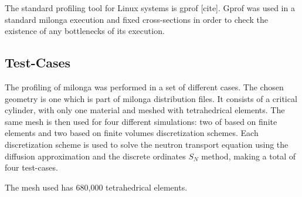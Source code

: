 \documentclass{anstrans}
\begin{document}
The standard profiling tool for Linux systems is gprof [cite]. Gprof was used in a standard milonga
execution
and fixed cross-sections in order to check
the existence of any bottlenecks of its execution.

\subsection{Test-Cases}

The profiling of milonga was performed in a set of different cases. The chosen geometry is one which is part of
milonga distribution files. It consists of a critical cylinder, with only one material and meshed with
tetrahedrical elements. The same mesh is then used for four different simulations: two of based on
finite elements and two based on finite volumes discretization schemes. Each discretization scheme is used
to solve the neutron transport equation using the diffusion approximation and the discrete ordinates $S_N$ method,
making a total of four test-cases.

The mesh used has 680,000 tetrahedrical elements.




\end{document}
